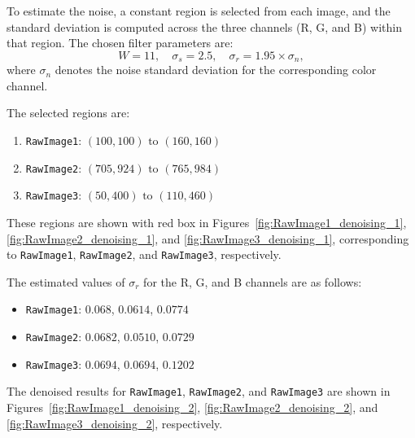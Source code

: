 \documentclass[11pt, a4]{article}
\begin{document}
\begin{enumerate}
		To estimate the noise, a constant region is selected from each image, and the standard deviation is computed across the three channels (R, G, and B) within that region. The chosen filter parameters are:  
		\[
		W = 11, \quad \sigma_s = 2.5, \quad \sigma_r = 1.95 \times \sigma_n,
		\]
		where $\sigma_n$ denotes the noise standard deviation for the corresponding color channel.  
		
		The selected regions are:  
		\begin{enumerate}
			\item \texttt{RawImage1}: $(100, 100) \text{ to } (160, 160)$
			\item \texttt{RawImage2}: $(705, 924) \text{ to } (765, 984)$
			\item \texttt{RawImage3}: $(50, 400) \text{ to } (110, 460)$
		\end{enumerate}
		
		These regions are shown with red box in Figures~\ref{fig:RawImage1_denoising_1}, \ref{fig:RawImage2_denoising_1}, and \ref{fig:RawImage3_denoising_1}, corresponding to \texttt{RawImage1}, \texttt{RawImage2}, and \texttt{RawImage3}, respectively.  
		
		The estimated values of $\sigma_r$ for the R, G, and B channels are as follows:  
		\begin{itemize}
			\item \texttt{RawImage1}: $0.068$, $0.0614$, $0.0774$
			\item \texttt{RawImage2}: $0.0682$, $0.0510$, $0.0729$
			\item \texttt{RawImage3}: $0.0694$, $0.0694$, $0.1202$
		\end{itemize}
		
		The denoised results for \texttt{RawImage1}, \texttt{RawImage2}, and \texttt{RawImage3} are shown in Figures~\ref{fig:RawImage1_denoising_2}, \ref{fig:RawImage2_denoising_2}, and \ref{fig:RawImage3_denoising_2}, respectively.
		

\end{enumerate}
\end{document}
